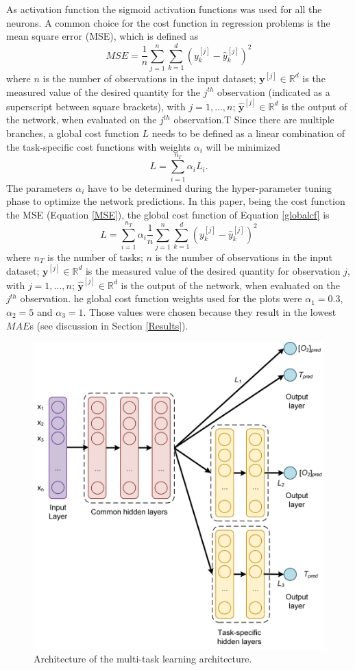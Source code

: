 \documentclass[9pt,twocolumn,twoside,pdftex]{optica}
\begin{document}
As activation function the sigmoid activation functions was used for all the neurons. A common choice for the cost function in regression problems is the mean square error (MSE), which is defined as
\begin{equation}
MSE = \frac{1}{n}\sum_{j=1}^n \sum_{k=1}^d (y_k^{[j]}-\hat y_k^{[j]})^2
\label{MSE}
\end{equation}
where $n$ is the number of observations in the input dataset; ${\mathbold y}^{[j]} \in \mathbb{R}^d$ is the measured value of the desired quantity for the $j^{th}$ observation (indicated as a superscript between square brackets), with $j=1, ..., n$; $ \hat {\mathbold y}^{[j]} \in \mathbb{R}^d$ is the output of the network, when evaluated on the $j^{th}$ observation.T Since there are multiple branches, a global cost function $L$ needs to be defined as a linear combination of the task-specific cost functions with weights $\alpha_i$ will be minimized
\begin{equation}
L = \sum_{i=1}^{n_T}\alpha_i L_i .
\label{globalcf}
\end{equation}
The parameters $\alpha_i$ have to be determined during the hyper-parameter tuning phase to optimize the network predictions.
In this paper, being the cost function the MSE (Equation \ref{MSE}), the global cost function of Equation \ref{globalcf} is
\begin{equation}
L = \sum_{i=1}^{n_T}\alpha_i \frac{1}{n}\sum_{j=1}^n \sum_{k=1}^d (y_k^{[j]}-\hat y_k^{[j]})^2
\end{equation}
where  $n_T$ is the number of tasks; $n$ is the number of observations in the input dataset; ${\mathbold y}^{[j]} \in \mathbb{R}^d$ is the measured value of the desired quantity for observation $j$, with $j=1, ..., n$; $ \hat {\mathbold y}^{[j]} \in \mathbb{R}^d$ is the output of the network, when evaluated on the $j^{th}$ observation.
he global cost function weights used for the plots were $\alpha_1 = 0.3$, $\alpha_2 = 5$ and $\alpha_3 = 1$. Those values were chosen because they result in the lowest $MAE$s (see discussion in Section \ref{Results}).
 
\begin{figure}[htbp]
\centering
\includegraphics[width=8.7 cm]{NN_MTL_O2_T.png}
\caption{Architecture of the multi-task learning architecture.}
\label{fig:NN_MTL_O2_T}
\end{figure}
\end{document}

